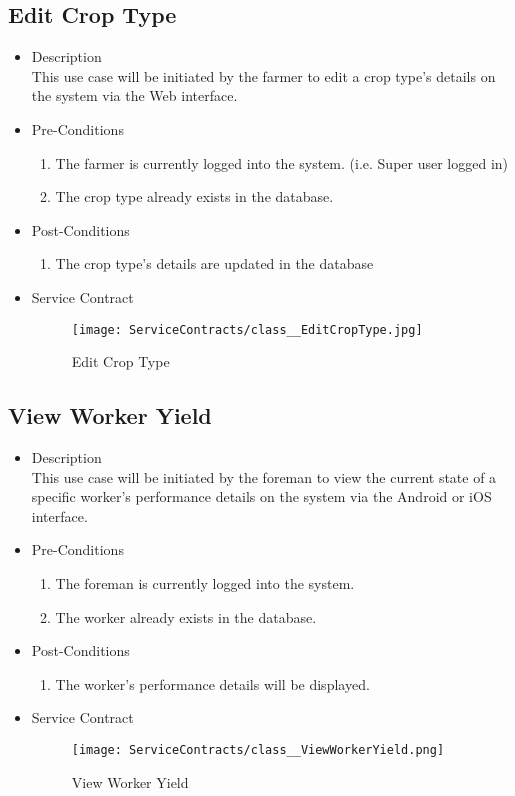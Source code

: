 \documentclass[11pt,fleqn]{book} %
\begin{document}
\subsection{Edit Crop Type}
\begin{itemize}
	\item Description\\
	This use case will be initiated by the farmer to edit a crop type’s details on the system via the Web interface.
	\item Pre-Conditions
	\begin{enumerate}
		\item The farmer is currently logged into the system. (i.e. Super user logged in)
		\item The crop type already exists in the database.					
	\end{enumerate}
	\item Post-Conditions
	\begin{enumerate}
		\item The crop type’s details are updated in the database
	\end{enumerate}
	\item Service Contract
	\begin{figure}
		\texttt{[image: ServiceContracts/class\_\_EditCropType.jpg]}
		\caption{Edit Crop Type}
	\end{figure}
\end{itemize}

\subsection{View Worker Yield}
\begin{itemize}
	\item Description\\
	This use case will be initiated by the foreman to view the current state of a specific worker’s performance details on the system via the Android or iOS interface.
	\item Pre-Conditions
	\begin{enumerate}
		\item The foreman is currently logged into the system.
		\item The worker already exists in the database.				 
	\end{enumerate}
	\item Post-Conditions
	\begin{enumerate}
		\item The worker’s performance details will be displayed.
	\end{enumerate}
	\item Service Contract
	\begin{figure}
		\texttt{[image: ServiceContracts/class\_\_ViewWorkerYield.png]}
		\caption{View Worker Yield}
	\end{figure}
\end{itemize}
\end{document}
